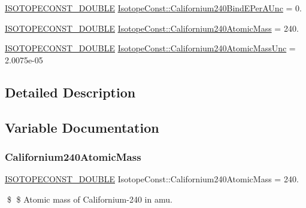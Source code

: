 \begin{DoxyCompactItemize}
\item 
\mbox{\hyperlink{group___isotope_const-_macros_ga8f45a7272ce02c0b4c65c44636ed719a}{I\+S\+O\+T\+O\+P\+E\+C\+O\+N\+S\+T\+\_\+\+D\+O\+U\+B\+LE}} \mbox{\hyperlink{group___isotope_const-_californium-_cf240_ga7e608df6f204acffdef2e40d014a8c72}{Isotope\+Const\+::\+Californium240\+Bind\+E\+Per\+A\+Unc}} = 0.
\item 
\mbox{\hyperlink{group___isotope_const-_macros_ga8f45a7272ce02c0b4c65c44636ed719a}{I\+S\+O\+T\+O\+P\+E\+C\+O\+N\+S\+T\+\_\+\+D\+O\+U\+B\+LE}} \mbox{\hyperlink{group___isotope_const-_californium-_cf240_ga7f8d4e0e6acd641b71d54a730d2416d3}{Isotope\+Const\+::\+Californium240\+Atomic\+Mass}} = 240.
\item 
\mbox{\hyperlink{group___isotope_const-_macros_ga8f45a7272ce02c0b4c65c44636ed719a}{I\+S\+O\+T\+O\+P\+E\+C\+O\+N\+S\+T\+\_\+\+D\+O\+U\+B\+LE}} \mbox{\hyperlink{group___isotope_const-_californium-_cf240_ga45cce3596b4c11f93771f2f00d30283d}{Isotope\+Const\+::\+Californium240\+Atomic\+Mass\+Unc}} = 2.\+0075e-\/05
\end{DoxyCompactItemize}


\subsection{Detailed Description}


\subsection{Variable Documentation}
\mbox{\label{group___isotope_const-_californium-_cf240_ga7f8d4e0e6acd641b71d54a730d2416d3}} 
\subsubsection{\texorpdfstring{Californium240\+Atomic\+Mass}{Californium240AtomicMass}}
{\footnotesize\ttfamily \mbox{\hyperlink{group___isotope_const-_macros_ga8f45a7272ce02c0b4c65c44636ed719a}{I\+S\+O\+T\+O\+P\+E\+C\+O\+N\+S\+T\+\_\+\+D\+O\+U\+B\+LE}} Isotope\+Const\+::\+Californium240\+Atomic\+Mass = 240.}

\$ \$ Atomic mass of Californium-\/240 in amu. \mbox{\label{group___isotope_const-_californium-_cf240_ga45cce3596b4c11f93771f2f00d30283d}} 
